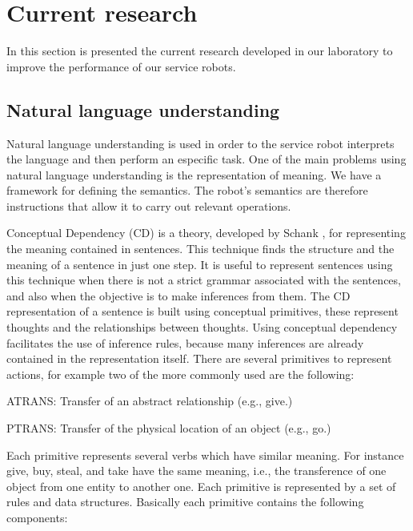 \documentclass{llncs}
\begin{document}

\section{Current research}\label{sec:CurrentResearch}
In this section is presented the current research developed in our laboratory to improve the performance of our service robots.

\subsection{Natural language understanding}\label{subsec:NaturalLU}
Natural language understanding is used in order to the service robot interprets the language and then perform an especific task.
One of the main problems using natural language understanding is the representation of meaning.  
We have a framework for defining the semantics. The robot's semantics are therefore instructions that allow it to carry out relevant operations.

Conceptual Dependency (CD) is a theory, developed by Schank \cite{Schank}, for representing the meaning contained in sentences. 
This technique finds the structure and the meaning of a sentence in just one step. 
It is useful to represent sentences using this technique when there is not a strict grammar associated with the sentences, and also when the objective is to make inferences from them.
The CD representation of a sentence is built using conceptual primitives, these represent thoughts and the relationships between thoughts. Using conceptual dependency facilitates the use of inference rules, because many inferences are already contained in the representation itself.
There are several primitives to represent actions, for example two of the more commonly used are the following:

\vspace{.01 in}
		ATRANS: Transfer of an abstract relationship (e.g., give.)

\vspace{.01 in}
		PTRANS: Transfer of the physical location of an object (e.g., go.)
\vspace{.01 in}

Each primitive represents several verbs which have similar meaning. For instance give, buy, steal, and take have the same meaning, i.e., the transference of one object from one entity to another one.
Each primitive is represented by a set of rules and data structures. Basically each primitive contains the following components:
\vspace{.01 in}
\end{document}
